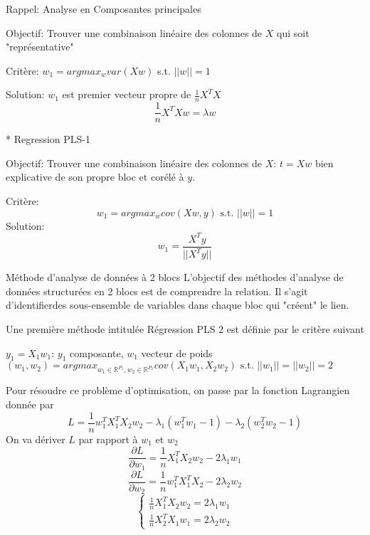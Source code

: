 \documentclass{article}
\begin{document}
Rappel: Analyse en Composantes principales

Objectif: Trouver une combinaison lin\'eaire des colonnes de $X$ qui soit "repr\'esentative"

Crit\`ere: $w_1=argmax_w var(Xw)$ s.t. $||w||=1$

Solution: $w_1$ est premier vecteur propre de $\frac{1}{n}X^TX$ 
\begin{equation}
\frac{1}{n}X^TXw=\lambda w
\end{equation}

* Regression PLS-1

Objectif: Trouver une combinaison lin\'eaire des colonnes de $X$: $t=Xw$ bien explicative de son propre bloc et cor\'el\'e \`a $y$.

Crit\`ere:
\begin{equation}
w_1=argmax_w cov(Xw,y) \text{ s.t. } ||w||=1
\end{equation}
Solution:
\begin{equation}
w_1=\frac{X^Ty}{||X^Ty||}
\end{equation}

M\'ethode d'analyse de donn\'ees \`a 2 blocs
L'objectif des m\'ethodes d'analyse de donn\'ees structur\'ees en 2 blocs est de comprendre la relation. Il s'agit d'identifierdes sous-ensemble de variables dans chaque bloc qui "cr\'eent" le lien.

Une premi\`ere m\'ethode intitul\'ee R\'egression PLS 2 est d\'efinie par le crit\`ere suivant

$y_1=X_1w_1$: $y_1$ composante, $w_1$ vecteur de poids
$(w_1, w_2)=argmax_{w_1\in\mathbb{R}^{P_1},w_2\in\mathbb{R}^{P_2}} cov(X_1w_1,X_2w_2) \text{ s.t. } ||w_1||=||w_2||=2$

Pour r\'esoudre ce probl\`eme d'optimisation, on passe par la fonction Lagrangien donn\'ee par
\begin{equation}
L=\frac{1}{n}w_1^TX_1^TX_2w_2-\lambda_1(w_1^Tw_1-1)-\lambda_2(w_2^Tw_2-1)
\end{equation}
On va d\'eriver $L$ par rapport \`a $w_1$ et $w_2$
\begin{equation}
\frac{\partial L}{\partial w_1}=\frac{1}{n}X_1^TX_2w_2-2\lambda_1w_1
\end{equation}
\begin{equation}
\frac{\partial L}{\partial w_2}=\frac{1}{n}w_1^TX_1^TX_2-2\lambda_2w_2
\end{equation}
\begin{equation}
\left\{\begin{array}{ll}
\frac{1}{n}X_1^TX_2w_2=2\lambda_1w_1\\
\frac{1}{n}X_2^TX_1w_1=2\lambda_2w_2
\end{array}\right.
\end{equation}
\end{document}
